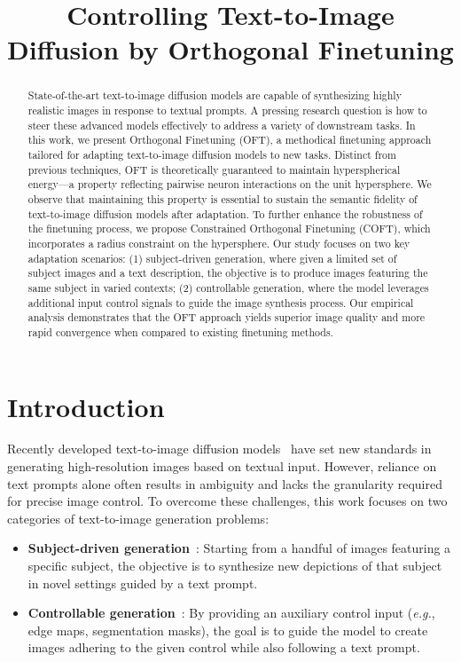 \title{Controlling Text-to-Image Diffusion by Orthogonal Finetuning}

\begin{abstract}
State-of-the-art text-to-image diffusion models are capable of synthesizing highly realistic images in response to textual prompts. A pressing research question is how to steer these advanced models effectively to address a variety of downstream tasks. In this work, we present Orthogonal Finetuning (OFT), a methodical finetuning approach tailored for adapting text-to-image diffusion models to new tasks. Distinct from previous techniques, OFT is theoretically guaranteed to maintain hyperspherical energy—a property reflecting pairwise neuron interactions on the unit hypersphere. We observe that maintaining this property is essential to sustain the semantic fidelity of text-to-image diffusion models after adaptation. To further enhance the robustness of the finetuning process, we propose Constrained Orthogonal Finetuning (COFT), which incorporates a radius constraint on the hypersphere. Our study focuses on two key adaptation scenarios: (1) subject-driven generation, where given a limited set of subject images and a text description, the objective is to produce images featuring the same subject in varied contexts; (2) controllable generation, where the model leverages additional input control signals to guide the image synthesis process. Our empirical analysis demonstrates that the OFT approach yields superior image quality and more rapid convergence when compared to existing finetuning methods.
\end{abstract}

\section{Introduction}

Recently developed text-to-image diffusion models~\cite{saharia2022photorealistic,ramesh2022hierarchical,rombach2022high} have set new standards in generating high-resolution images based on textual input. However, reliance on text prompts alone often results in ambiguity and lacks the granularity required for precise image control. To overcome these challenges, this work focuses on two categories of text-to-image generation problems:

\begin{itemize}[leftmargin=*,nosep]

    \item \textbf{Subject-driven generation}~\cite{ruiz2023dreambooth}: Starting from a handful of images featuring a specific subject, the objective is to synthesize new depictions of that subject in novel settings guided by a text prompt.
    \item \textbf{Controllable generation}~\cite{zhang2023adding,mou2023t2i}: By providing an auxiliary control input (\emph{e.g.}, edge maps, segmentation masks), the goal is to guide the model to create images adhering to the given control while also following a text prompt.
\end{itemize}

